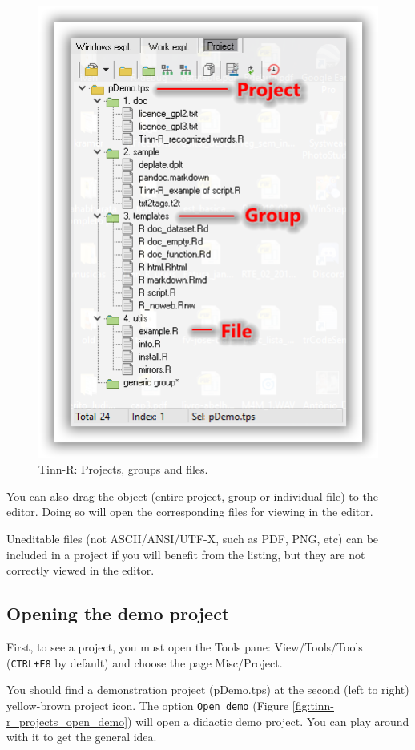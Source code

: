 \begin{figure}[H]
  \begin{center}
    \includegraphics[scale=0.60]{./res/projects_files_groups.png}
  \end{center}
  \caption{Tinn-R: Projects, groups and files.}
  \label{fig:tinn-r_projects_file_groups}
\end{figure}

You can also drag the object (entire project, group or individual file) to the editor. 
Doing so will open the corresponding files for viewing in the editor.

Uneditable files (not ASCII/ANSI/UTF-X, such as PDF, PNG, etc) can be included in 
a project if you will benefit from the listing, but 
they are not correctly viewed in the editor.

\subsection{Opening the demo project}
First, to see a project, you must open the Tools pane: View/Tools/Tools (\texttt{CTRL+F8} by default) 
and choose the page Misc/Project.

You should find a demonstration project (pDemo.tps) at the second (left to right) 
yellow-brown project icon. The option \texttt{Open demo} 
(Figure \ref{fig:tinn-r_projects_open_demo})
will open a didactic demo project. 
You can play around with it to get the general idea.

